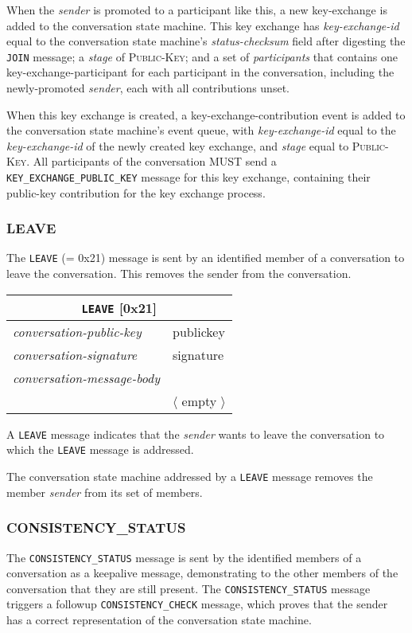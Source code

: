 \documentclass{article}
\def\message#1{\texttt{#1}}
\def\field#1{\textit{#1}}
\def\smfield#1{\textsl{#1}}
\def\type#1{\textsf{#1}}
\newenvironment{conversationmessage}[2]{
\newcommand{\messagefield}[2]{
& \field{##1} & \type{##2} \\
\hline
}
\hspace{2em minus 2em}\begin{tabular}{|l|l|l|}
\hline
\multicolumn{3}{|c|}{\message{#1} [#2]} \\
\hline
\hline
\field{conversation-public-key} & \multicolumn{2}{l|}{\type{publickey}} \\
\hline
\field{conversation-signature} & \multicolumn{2}{l|}{\type{signature}} \\
\hline
\field{conversation-message-body} & \multicolumn{2}{l|}{} \\
\hline
}{
\end{tabular}
}
\newcommand\emptyconversationmessage[2]{
\begin{conversationmessage}{#1}{#2}
& \multicolumn{2}{|l|}{ $\langle$ empty $\rangle$ } \\
\hline
\end{conversationmessage}
}
\begin{document}
When the \field{sender} is promoted to a participant like this, a new \type{key-exchange} is added to the conversation state machine.
This key exchange has \smfield{key-exchange-id} equal to the conversation state machine's \smfield{status-checksum} field after digesting the \message{JOIN} message; a \smfield{stage} of \textsc{Public-Key}; and a set of \smfield{participants} that contains one \type{key-exchange-participant} for each participant in the conversation, including the newly-promoted \field{sender}, each with all contributions unset.

When this key exchange is created, a \type{key-exchange-contribution} event is added to the conversation state machine's event queue, with \smfield{key-exchange-id} equal to the \smfield{key-exchange-id} of the newly created key exchange, and \smfield{stage} equal to \textsc{Public-Key}.
All participants of the conversation MUST send a \message{KEY\_EXCHANGE\_PUBLIC\_KEY} message for this key exchange, containing their public-key contribution for the key exchange process.


\subsubsection{LEAVE}
\label{sec:messages/leave}

The \message{LEAVE} (= 0x21) message is sent by an identified member of a conversation to leave the conversation.
This removes the sender from the conversation.

\emptyconversationmessage{LEAVE}{0x21}

A \message{LEAVE} message indicates that the \field{sender} wants to leave the conversation to which the \message{LEAVE} message is addressed.

The conversation state machine addressed by a \message{LEAVE} message removes the member \field{sender} from its set of members.


\subsubsection{CONSISTENCY\_STATUS}
\label{sec:messages/consistency-status}

The \message{CONSISTENCY\_STATUS} message is sent by the identified members of a conversation as a keepalive message, demonstrating to the other members of the conversation that they are still present.
The \message{CONSISTENCY\_STATUS} message triggers a followup \message{CONSISTENCY\_CHECK} message, which proves that the sender has a correct representation of the conversation state machine.
\end{document}
